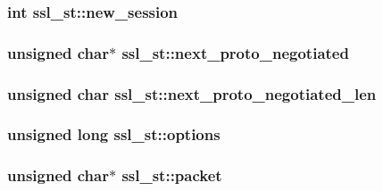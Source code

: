 \subsubsection[{\texorpdfstring{new\+\_\+session}{new_session}}]{\setlength{\rightskip}{0pt plus 5cm}int ssl\+\_\+st\+::new\+\_\+session}\hypertarget{structssl__st_a5e265a8751b5a1641b71efda933a6b61}{}\label{structssl__st_a5e265a8751b5a1641b71efda933a6b61}
\subsubsection[{\texorpdfstring{next\+\_\+proto\+\_\+negotiated}{next_proto_negotiated}}]{\setlength{\rightskip}{0pt plus 5cm}unsigned char$\ast$ ssl\+\_\+st\+::next\+\_\+proto\+\_\+negotiated}\hypertarget{structssl__st_aef796f12c3e90c045baad0cd1841e180}{}\label{structssl__st_aef796f12c3e90c045baad0cd1841e180}
\subsubsection[{\texorpdfstring{next\+\_\+proto\+\_\+negotiated\+\_\+len}{next_proto_negotiated_len}}]{\setlength{\rightskip}{0pt plus 5cm}unsigned char ssl\+\_\+st\+::next\+\_\+proto\+\_\+negotiated\+\_\+len}\hypertarget{structssl__st_aa530fc5efd1d6b0f5f881dbd78b6d3de}{}\label{structssl__st_aa530fc5efd1d6b0f5f881dbd78b6d3de}
\subsubsection[{\texorpdfstring{options}{options}}]{\setlength{\rightskip}{0pt plus 5cm}unsigned long ssl\+\_\+st\+::options}\hypertarget{structssl__st_a82c8bfd123603c23ccca6fb45be6d75f}{}\label{structssl__st_a82c8bfd123603c23ccca6fb45be6d75f}
\subsubsection[{\texorpdfstring{packet}{packet}}]{\setlength{\rightskip}{0pt plus 5cm}unsigned char$\ast$ ssl\+\_\+st\+::packet}\hypertarget{structssl__st_a5b43e468488be2327eac1c4396b568bc}{}\label{structssl__st_a5b43e468488be2327eac1c4396b568bc}

